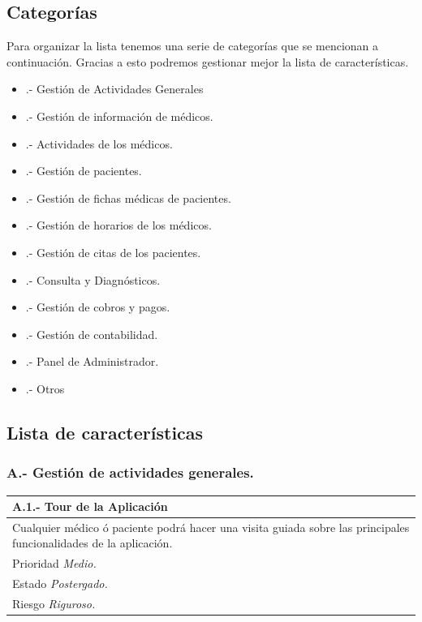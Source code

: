 \documentclass[a4paper,oneside,11pt]{book}
\begin{document}
\subsection{Categorías}
Para organizar la lista tenemos una serie de categorías que se mencionan a continuación. Gracias a esto podremos gestionar mejor la lista de características.
\begin{itemize}
\item [A].- Gestión de Actividades Generales 
\item [B].- Gestión de información de médicos.
\item [C].- Actividades de los médicos.
\item [D].- Gestión de pacientes.
\item [E].- Gestión de fichas médicas de pacientes.
\item [F].- Gestión de horarios de los médicos.
\item [G].- Gestión de citas de los pacientes.
\item [H].- Consulta y Diagnósticos.
\item [I].- Gestión de cobros y pagos.
\item [J].- Gestión de contabilidad.
\item [K].- Panel de Administrador.
\item [L].- Otros
\end{itemize}

\subsection{Lista de características}

\subsubsection{A.- Gestión de actividades generales.}

\begin{center}
\begin{tabulary}{15cm}{|L|}
	\hline
		\bf{A.1.- Tour de la Aplicación} \\
	\hline
		Cualquier médico ó paciente podrá hacer una visita guiada sobre las principales funcionalidades de la aplicación.\\
	\hline
		Prioridad \textit{Medio.} \\
	\hline
		Estado \textit{Postergado.} \\
	\hline
		Riesgo \textit{Riguroso.} \\
	\hline
\end{tabulary}
\end{center}
\end{document}
